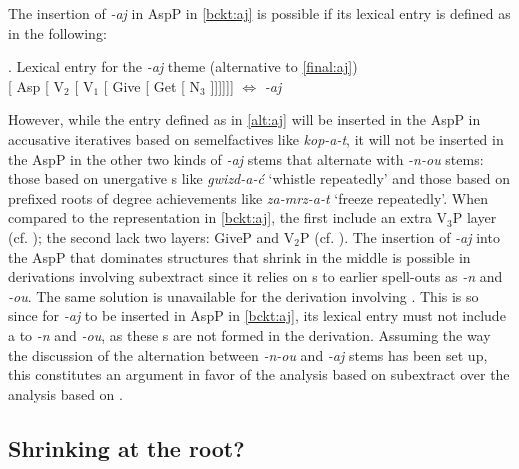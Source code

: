 \vskip 0.25cm
\noindent The insertion of \textit{-aj} in AspP in \ref{bckt:aj} is possible if its lexical entry is defined as in the following:

\ex.\label{alt:aj} Lexical entry for the \textit{-aj} theme (alternative to \ref{final:aj})\\[0.5ex]
[ Asp [ V$_{2}$ [ V$_{1}$ [ Give [ Get [ N$_{3}$ ]]]]]] $\Leftrightarrow$ \textit{-aj}

\noindent
However, while the entry defined as in \ref{alt:aj} will be inserted in the AspP in accusative iteratives based on  semelfactives like \textit{kop-a-t}, it
will not be inserted in the AspP in the other two kinds of \textit{-aj} stems that alternate with \textit{-n-ou} stems: those based on unergative s like \textit{gwizd-a-\'c} `whistle repeatedly' and those based on prefixed roots of  degree achievements like \textit{za-mrz-a-t} `freeze repeatedly'.  
When compared to the representation in \ref{bckt:aj}, the first include an extra V$_{3}$P layer (cf. ); the second lack two layers: GiveP and V$_{2}$P (cf. ). 
The insertion of \textit{-aj} into the AspP that dominates structures that shrink  in the middle is possible in derivations involving subextract since it relies on s to earlier spell-outs as \textit{-n} and \textit{-ou}. The same solution is unavailable for the derivation involving . This is so since for \textit{-aj} to be inserted in AspP in \ref{bckt:aj}, its lexical entry must not include a  to \textit{-n} and \textit{-ou}, as these s are not formed in the  derivation. Assuming the way the discussion of the  alternation between \textit{-n-ou} and \textit{-aj} stems has been set up, this constitutes an argument in favor of the analysis based on subextract over the analysis based on . 

\subsection{Shrinking  at the root?}

